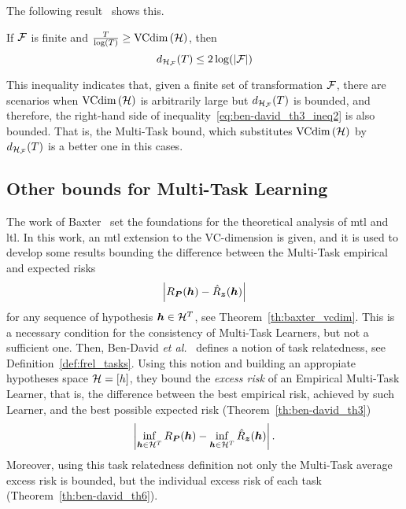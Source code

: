 The following result~\cite[Theorem~6]{Ben-DavidB08} shows this.
\begin{theorem}\label{th:ben-david_th6}
    If $\mathcal{F}$ is finite and $\frac{T}{\log (T)} \geq \text{VCdim}\left(\mathcal{H}\right)$, then
    \begin{equation}
        \nonumber
        d_{\mathcal{H}_{\mathcal{F}}}(T) \leq 2 \log(\left|\mathcal{F}\right|)
    \end{equation}
\end{theorem}
This inequality indicates that, given a finite set of transformation $\mathcal{F}$, there are scenarios when $\text{VCdim}\left(\mathcal{H}\right)$ is arbitrarily large but $d_{\mathcal{H}_{\mathcal{F}}}(T)$ is bounded, and therefore, the right-hand side of inequality~\eqref{eq:ben-david_th3_ineq2} is also bounded. That is, the Multi-Task bound, which substitutes $\text{VCdim}\left(\mathcal{H}\right)$ by $d_{\mathcal{H}_{\mathcal{F}}}(T)$ is a better one in this cases. 



\subsection{Other bounds for Multi-Task Learning}
The work of Baxter~\cite{baxter2000model} set the foundations for the theoretical analysis of \acrshort{mtl} and \acrshort{ltl}. 
In this work, an \acrshort{mtl} extension to the VC-dimension is given, and it is used to develop some results bounding the difference between the Multi-Task empirical and expected risks 
\begin{equation}
    \nonumber
    \left|R_{\bm{P}}(\bm{h}) - \hat{R}_{\bm{z}}(\bm{h})\right|
\end{equation}
for any sequence of hypothesis $\bm{h} \in \mathcal{H}^T$, see Theorem~\ref{th:baxter_vcdim}. This is a necessary condition for the consistency of Multi-Task Learners, but not a sufficient one.
Then, Ben-David \emph{et al.}~\cite{Ben-DavidS03,Ben-DavidB08} defines a notion of task relatedness, see Definition~\ref{def:frel_tasks}. Using this notion and building an appropiate hypotheses space $\mathcal{H} = \lbrack h\rbrack$, they bound the \emph{excess risk} of an Empirical Multi-Task Learner, that is, the difference between the best empirical risk, achieved by such Learner, and the best possible expected risk (Theorem~\ref{th:ben-david_th3})
\begin{equation}
    \nonumber
    \left|\inf_{\bm{h} \in \mathcal{H}^T} R_{\bm{P}}(\bm{h}) - \inf_{\bm{h} \in \mathcal{H}^T} \hat{R}_{\bm{z}}(\bm{h})\right| .
\end{equation}
Moreover, using this task relatedness definition not only the Multi-Task average excess risk is bounded, but the individual excess risk of each task (Theorem~\ref{th:ben-david_th6}).

